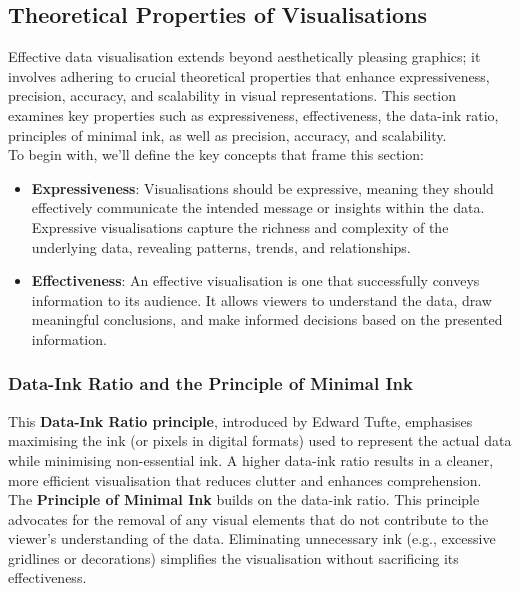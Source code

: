 \documentclass{article}\usepackage[]{graphicx}\usepackage[]{xcolor}
\begin{document}
\subsection{Theoretical Properties of Visualisations}
Effective data visualisation extends beyond aesthetically pleasing graphics; it involves adhering to crucial theoretical properties that enhance expressiveness, precision, accuracy, and scalability in visual representations. This section examines key properties such as expressiveness, effectiveness, the data-ink ratio, principles of minimal ink, as well as precision, accuracy, and scalability.\\

\noindent
To begin with, we'll define the key concepts that frame this section:

\begin{itemize}
    \item \textbf{Expressiveness}: Visualisations should be expressive, meaning they should effectively communicate the intended message or insights within the data. Expressive visualisations capture the richness and complexity of the underlying data, revealing patterns, trends, and relationships.
    \item \textbf{Effectiveness}: An effective visualisation is one that successfully conveys information to its audience. It allows viewers to understand the data, draw meaningful conclusions, and make informed decisions based on the presented information.
\end{itemize}

\subsubsection{Data-Ink Ratio and the Principle of Minimal Ink} 

This \textbf{Data-Ink Ratio principle}, introduced by Edward Tufte, emphasises maximising the ink (or pixels in digital formats) used to represent the actual data while minimising non-essential ink. A higher data-ink ratio results in a cleaner, more efficient visualisation that reduces clutter and enhances comprehension.\\

\noindent
The \textbf{Principle of Minimal Ink} builds on the data-ink ratio. This principle advocates for the removal of any visual elements that do not contribute to the viewer's understanding of the data. Eliminating unnecessary ink (e.g., excessive gridlines or decorations) simplifies the visualisation without sacrificing its effectiveness.\\
\end{document}
